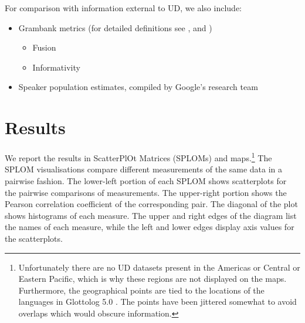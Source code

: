 \documentclass[USenglish]{article}
\begin{document}
For comparison with information external to UD, we also include:

\begin{itemize}
    \item Grambank metrics (for detailed definitions see \citet{grambank_release}, \citet{shcherbakova2023societies} and \citet{R-rgrambank}) 
\begin{itemize}
\item Fusion 
\item Informativity 
\end{itemize}
    \item Speaker population estimates, compiled by Google's research team \citep{ritchie-etal-2024-linguameta-unified}
\end{itemize}


\section{Results}
We report the results in ScatterPlOt Matrices (SPLOMs) and maps.\footnote{Unfortunately there are no UD datasets present in the Americas or Central or Eastern Pacific, which is why these regions are not displayed on the maps. Furthermore, the geographical points are tied to the locations of the languages in Glottolog 5.0 \citep{glottolog5.0}. The points have been jittered somewhat to avoid overlaps which would obscure information.}
The SPLOM visualisations compare different measurements of the same data in a  pairwise fashion. 
The lower-left portion of each SPLOM shows scatterplots for the pairwise comparisons of measurements.
The upper-right portion shows the Pearson correlation coefficient of the corresponding pair. 
The diagonal of the plot shows histograms of each measure. 
The upper and right edges of the diagram list the names of each measure, while the left and lower edges display axis values for the scatterplots.
\end{document}
